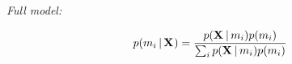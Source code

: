 \begin{frame}[t]
\begin{block}{\it Full model:}
\begin{minipage}[c][3.8cm][c]{\linewidth}
\begin{uncoverenv}
            \[
                p(\divModel{i} \given \alignmentVector) =
                \frac{
                    p(\alignmentVector \given \divModel{i})
                    p(\divModel{i})
                }{
                    \sum_{i} p(\alignmentVector \given \divModel{i})
                    p(\divModel{i})
                }
            \]\vspace{-1mm}
            \end{uncoverenv}
        \end{minipage}
    \end{block}

\end{frame}
